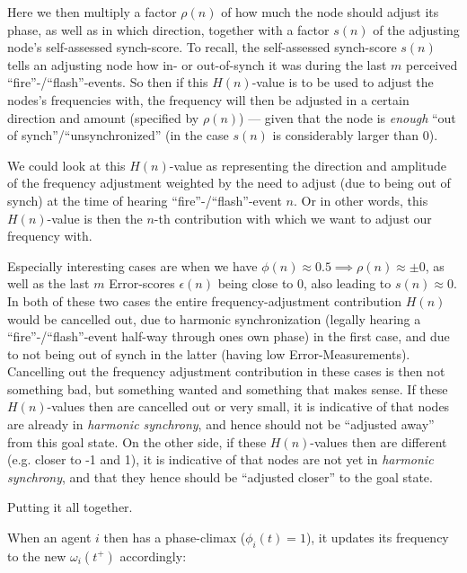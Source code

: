 			Here we then multiply a factor $\rho(n)$ of how much the node should adjust its phase, as well as in which direction, together with a factor $s(n)$ of the adjusting node's self-assessed synch-score. To recall, the self-assessed synch-score $s(n)$ tells an adjusting node how in- or out-of-synch it was during the last $m$ perceived ``fire''-/``flash''-events. So then if this $H(n)$-value is to be used to adjust the nodes's frequencies with, the frequency will then be adjusted in a certain direction and amount (specified by $\rho(n)$) — given that the node is \textit{enough} ``out of synch''/``unsynchronized'' (in the case $s(n)$ is considerably larger than 0).
			
			We could look at this $H(n)$-value as representing the direction and amplitude of the frequency adjustment weighted by the need to adjust (due to being out of synch) at the time of hearing ``fire''-/``flash''-event $n$. Or in other words, this $H(n)$-value is then the $n$-th contribution with which we want to adjust our frequency with.
			
			Especially interesting cases are when we have $\phi(n)\approx0.5 \implies \rho(n)\approx\pm0$, as well as the last $m$ Error-scores $\epsilon(n)$ being close to 0, also leading to $s(n)\approx0$. In both of these two cases the entire frequency-adjustment contribution $H(n)$ would be cancelled out, due to harmonic synchronization (legally hearing a ``fire''-/``flash''-event half-way through ones own phase) in the first case, and due to not being out of synch in the latter (having low Error-Measurements). Cancelling out the frequency adjustment contribution in these cases is then not something bad, but something wanted and something that makes sense. If these $H(n)$-values then are cancelled out or very small, it is indicative of that nodes are already in \textit{harmonic synchrony}, and hence should not be ``adjusted away'' from this goal state. On the other side, if these $H(n)$-values then are different (e.g. closer to -1 and 1), it is indicative of that nodes are not yet in \textit{harmonic synchrony}, and that they hence should be ``adjusted closer'' to the goal state.
			
			
			Putting it all together.
			
			When an agent $i$ then has a phase-climax ($\phi_i(t)=1$), it updates its frequency to the new $\omega_i(t^+)$ accordingly:
			
